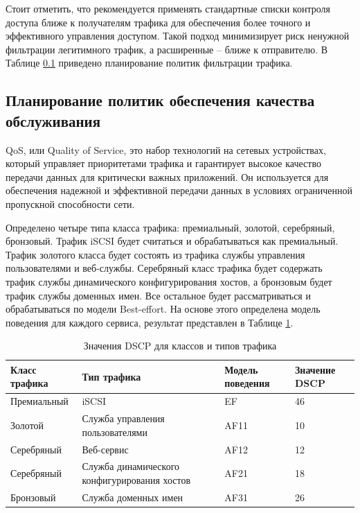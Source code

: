 \documentclass[14pt, a4paper]{extarticle}
\numberwithin{equation}{section}
\begin{document}
Стоит отметить, что рекомендуется применять стандартные списки контроля доступа 
ближе к получателям трафика для обеспечения более точного и эффективного управления доступом. 
Такой подход минимизирует риск ненужной фильтрации легитимного трафик,
а расширенные -- ближе к отправителю. В Таблице \ref{} приведено планирование
политик фильтрации трафика.


\subsection{Планирование политик обеспечения качества обслуживания}

QoS, или Quality of Service, это набор технологий на сетевых устройствах, который 
управляет приоритетами трафика и гарантирует высокое качество передачи данных для 
критически важных приложений. Он используется для обеспечения надежной и эффективной 
передачи данных в условиях ограниченной пропускной способности сети.

Определено четыре типа класса трафика: премиальный, золотой, серебряный, бронзовый. 
Трафик iSCSI будет считаться и обрабатываться как премиальный. Трафик золотого класса будет состоять 
из трафика службы управления пользователями и веб-службы. 
Серебряный класс трафика будет содержать трафик службы динамического конфигурирования хостов, а 
бронзовым будет трафик службы доменных имен. Все остальное будет рассматриваться и обрабатываться по модели Best-effort.
На основе этого определена модель поведения для каждого сервиса, результат представлен в Таблице \ref{table:qos}.

\begin{table}[H]
\centering
\small
\caption{Значения DSCP для классов и типов трафика}
\label{table:qos}
\begin{tabular}{|m{3cm}|m{3.5cm}|m{3cm}|m{3cm}|}
\hline
\textbf{Класс трафика} & \textbf{Тип трафика} & \textbf{Модель поведения} & \textbf{Значение DSCP} \\
\hline
Премиальный & iSCSI & EF & 46 \\
\hline
Золотой & Служба управления пользователями & AF11 & 10 \\
\hline
Серебряный & Веб-сервис & AF12 & 12 \\
\hline
Серебряный & Служба динамического конфигурирования хостов & AF21 & 18 \\
\hline
Бронзовый & Служба доменных имен & AF31 & 26 \\
\hline
\end{tabular}
\end{table}
\end{document}

